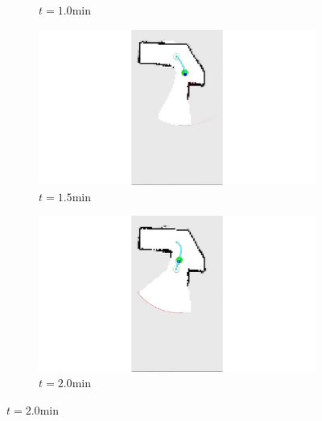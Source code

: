\documentclass[11pt,professionalfonts,hyperref={pdftex,pdfpagemode=none,pdfstartview=FitH}]{beamer}
\begin{document}
\begin{frame}
\begin{figure}
{\begin{subfigure}[b]{0.19\textwidth}
        		\caption*{$t=1.0$min}
        		\label{fig:Experiment_ogm_t1}
    	\end{subfigure}
	\begin{subfigure}[b]{0.19\textwidth}
        		\includegraphics[trim={13cm 1cm 13cm 0}, clip, width=\textwidth]{t_1p5min.jpg}
        		\caption*{$t=1.5$min}
        		\label{fig:Experiment_ogm_t1p5}
    	\end{subfigure}
	\begin{subfigure}[b]{0.19\textwidth}
        		\includegraphics[trim={13cm 1cm 13cm 0}, clip, width=\textwidth]{t_2min.jpg}
        		\caption*{$t=2.0$min}
        		\label{fig:Experiment_ogm_t2}
    	\end{subfigure}
		\vspace*{0.05\textwidth}

}
\end{figure}
\end{frame}
\end{document}
